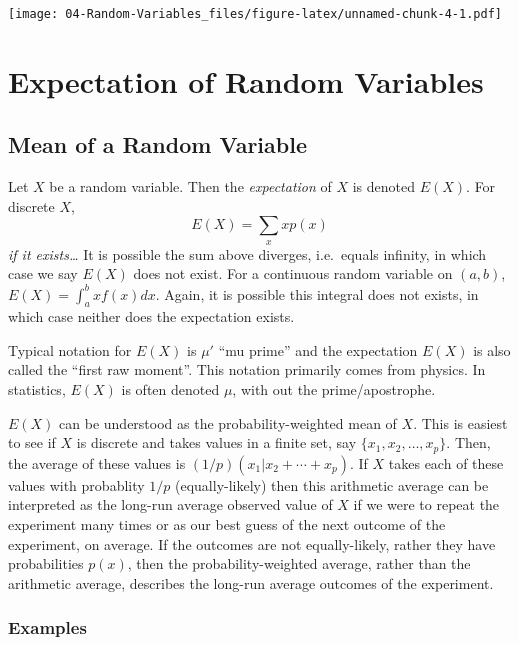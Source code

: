 \documentclass[
]{book}
\begin{document}
\texttt{[image: 04-Random-Variables\_files/figure-latex/unnamed-chunk-4-1.pdf]}

\hypertarget{expectation-of-random-variables}{%
\chapter{Expectation of Random Variables}\label{expectation-of-random-variables}}

\hypertarget{mean-of-a-random-variable}{%
\section{Mean of a Random Variable}\label{mean-of-a-random-variable}}

Let \(X\) be a random variable. Then the \emph{expectation} of \(X\) is denoted \(E(X)\). For discrete \(X\),
\[E(X) = \sum_{x} x p(x)\]
\emph{if it exists\ldots{}} It is possible the sum above diverges, i.e.~equals infinity, in which case we say \(E(X)\) does not exist. For a continuous random variable on \((a,b)\),
\(E(X) = \int_a^b x f(x)dx\). Again, it is possible this integral does not exists, in which case neither does the expectation exists.

Typical notation for \(E(X)\) is \(\mu'\) ``mu prime'' and the expectation \(E(X)\) is also called the ``first raw moment''. This notation primarily comes from physics. In statistics, \(E(X)\) is often denoted \(\mu\), with out the prime/apostrophe.

\(E(X)\) can be understood as the probability-weighted mean of \(X\). This is easiest to see if \(X\) is discrete and takes values in a finite set, say \(\{x_1, x_2, \ldots, x_p\}\). Then, the average of these values is \((1/p)(x_1 | x_2 + \cdots + x_p)\). If \(X\) takes each of these values with probablity \(1/p\) (equally-likely) then this arithmetic average can be interpreted as the long-run average observed value of \(X\) if we were to repeat the experiment many times or as our best guess of the next outcome of the experiment, on average. If the outcomes are not equally-likely, rather they have probabilities \(p(x)\), then the probability-weighted average, rather than the arithmetic average, describes the long-run average outcomes of the experiment.

\hypertarget{examples}{%
\subsection{Examples}\label{examples}}
\end{document}
